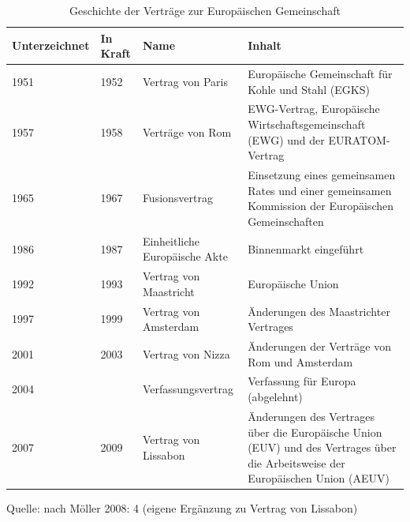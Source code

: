 \begin{table}[!hbt]\vspace{1ex}\centering
\caption{Geschichte der Verträge zur Europäischen Gemeinschaft}
\small
\begin{tabular}{|p{12mm}|p{12mm}|p{4cm}|p{7cm}|}\hline
Unter\-zeichnet &In Kraft & Name&Inhalt\\\hline
1951&1952&Vertrag von Paris&Europäische Gemeinschaft für Kohle und Stahl (EGKS)\\\hline
1957&1958&Verträge von Rom&EWG-Vertrag, Europäische Wirtschaftsgemeinschaft (EWG) und der EURATOM-Vertrag\\\hline
1965&1967&Fusionsvertrag&Einsetzung eines gemeinsamen Rates und einer gemeinsamen Kommission der Europäischen Gemeinschaften\\\hline
1986&1987&Einheitliche Europäische Akte&Binnenmarkt eingeführt\\\hline
1992&1993&Vertrag von Maastricht&Europäische Union\\\hline
1997&1999&Vertrag von Amsterdam&Änderungen des Maastrichter Vertrages\\\hline
2001&2003&Vertrag von Nizza&Änderungen der Verträge von Rom und Amsterdam\\\hline
2004& &Verfassungsvertrag&Verfassung für Europa (abgelehnt)\\\hline
2007&2009&Vertrag von Lissabon&Änderungen des Vertrages über die Europäische Union (EUV) und des Vertrages über die Arbeitsweise der Europäischen Union (AEUV)\\\hline
\end{tabular}
\end{table}
Quelle: nach Möller 2008: 4 (eigene Ergänzung zu Vertrag von Lissabon)

